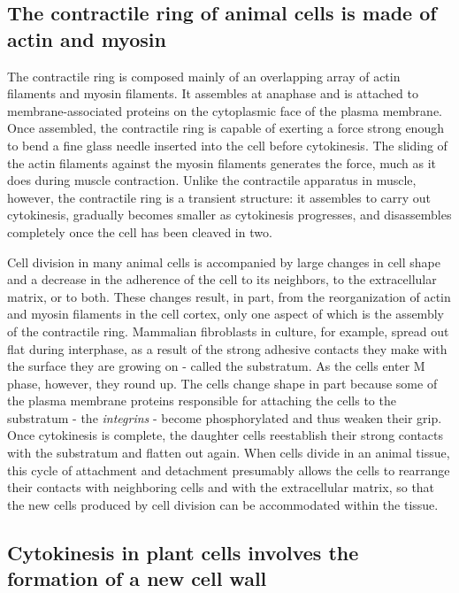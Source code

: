 \subsection{The contractile ring of animal cells is made of actin and myosin}

The contractile ring is composed mainly of an overlapping array of actin
filaments and myosin filaments. It assembles at anaphase
and is attached to membrane-associated proteins on the cytoplasmic face
of the plasma membrane. Once assembled, the contractile ring is capable
of exerting a force strong enough to bend a fine glass needle inserted into
the cell before cytokinesis. The sliding of the actin filaments against the
myosin filaments generates the force, much as it does
during muscle contraction. Unlike the contractile apparatus in muscle,
however, the contractile ring is a transient structure: it assembles to carry
out cytokinesis, gradually becomes smaller as cytokinesis progresses,
and disassembles completely once the cell has been cleaved in two.

Cell division in many animal cells is accompanied by large changes in
cell shape and a decrease in the adherence of the cell to its neighbors, to
the extracellular matrix, or to both. These changes result, in part, from
the reorganization of actin and myosin filaments in the cell cortex, only
one aspect of which is the assembly of the contractile ring. Mammalian
fibroblasts in culture, for example, spread out flat during interphase, as
a result of the strong adhesive contacts they make with the surface they
are growing on - called the substratum. As the cells enter M phase, however,
they round up. The cells change shape in part because some of
the plasma membrane proteins responsible for attaching the cells to the
substratum - the \textit{integrins} - become phosphorylated
and thus weaken their grip. Once cytokinesis is complete, the
daughter cells reestablish their strong contacts with the substratum and
flatten out again. When cells divide in an animal tissue,
this cycle of attachment and detachment presumably allows the cells to
rearrange their contacts with neighboring cells and with the extracellular
matrix, so that the new cells produced by cell division can be accommodated
within the tissue.

\subsection{Cytokinesis in plant cells involves the formation of a new cell wall}

